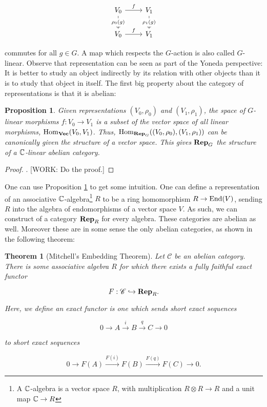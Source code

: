 \documentclass{article}
\newtheorem{theorem}{Theorem}
\newtheorem{proposition}{Proposition}
\theoremstyle{definition}
\numberwithin{figure}{section}
\begin{document}
\[\begin{tikzcd}
	{V_0} & {V_1} \\
	{V_0} & {V_1}
	\arrow["f", from=1-1, to=1-2]
	\arrow["f", from=2-1, to=2-2]
	\arrow["{\rho_0(g)}"{description}, from=1-1, to=2-1]
	\arrow["{\rho_1(g)}"{description}, from=1-2, to=2-2]
\end{tikzcd}\]

commutes for all $g\in G$. A map which respects the $G$-action is also called $G$-linear. Observe that representation can be seen as part of the Yoneda perspective: It is better to study an object indirectly by its relation with other objects than it is to study that object in itself. The first big property about the category of representations is that it is abelian:

\begin{proposition}\label{abelian represenations} Given representations $(V_0,\rho_0)$ and $(V_1,\rho_1)$, the space of $G$-linear morphisms $f:V_0\to V_1$ is a subset of the vector space of all linear morphisms, $\mathrm{Hom}_{\bold{Vec}}(V_0,V_1)$. Thus, $\mathrm{Hom}_{\bold{Rep}_{G}}((V_0,\rho_0),(V_1,\rho_1))$ can be canonically given the structure of a vector space. This gives $\bold{Rep}_{G}$ the structure of a $\mathbb{C}$-linear abelian category.
\end{proposition}
\begin{proof}. [WORK: Do the proof.]
\end{proof}

One can use Proposition \ref{abelian represenations} to get some intuition. One can define a representation of an associative $\mathbb{C}$-algebra\footnote{A $\mathbb{C}$-algebra is a vector space $R$, with multiplication $R\otimes R\to R$ and a unit map $\mathbb{C}\to R$} $R$ to be a ring homomorphism $R\to \mathrm{End}(V)$, sending $R$ into the algebra of endomorphisms of a vector space $V$. As such, we can construct of a category $\bold{Rep}_R$ for every algebra. These categories are abelian as well. Moreover these are in some sense the only abelian categories, as shown in the following theorem:

\begin{theorem}[Mitchell's Embedding Theorem] Let $\mathscr{C}$ be an abelian category. There is some associative algebra $R$ for which there exists a fully faithful exact functor

$$F: \mathscr{C}\hookrightarrow{}\bold{Rep}_R.$$

Here, we define an exact functor is one which sends short exact sequences

$$0\to A\xrightarrow{i}B\xrightarrow{q}C\to 0$$

to short exact sequences

$$0\to F(A)\xrightarrow{F(i)}F(B)\xrightarrow{F(q)}F(C)\to 0.$$
\end{theorem}
\end{document}

